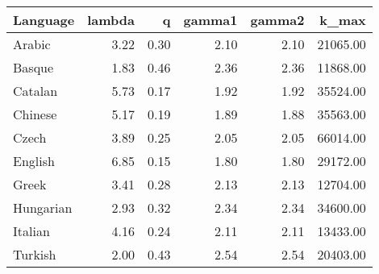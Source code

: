 \begin{table}[ht]
\centering
\begin{tabular}{lrrrrr}
  \hline
Language & lambda & q & gamma1 & gamma2 & k\_max \\ 
  \hline
Arabic & 3.22 & 0.30 & 2.10 & 2.10 & 21065.00 \\ 
  Basque & 1.83 & 0.46 & 2.36 & 2.36 & 11868.00 \\ 
  Catalan & 5.73 & 0.17 & 1.92 & 1.92 & 35524.00 \\ 
  Chinese & 5.17 & 0.19 & 1.89 & 1.88 & 35563.00 \\ 
  Czech & 3.89 & 0.25 & 2.05 & 2.05 & 66014.00 \\ 
  English & 6.85 & 0.15 & 1.80 & 1.80 & 29172.00 \\ 
  Greek & 3.41 & 0.28 & 2.13 & 2.13 & 12704.00 \\ 
  Hungarian & 2.93 & 0.32 & 2.34 & 2.34 & 34600.00 \\ 
  Italian & 4.16 & 0.24 & 2.11 & 2.11 & 13433.00 \\ 
  Turkish & 2.00 & 0.43 & 2.54 & 2.54 & 20403.00 \\ 
   \hline
\end{tabular}
\end{table}
